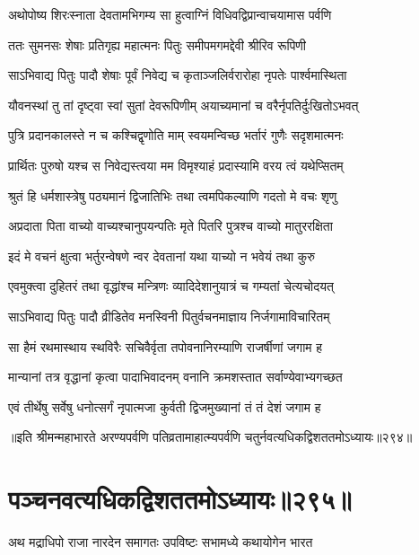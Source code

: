 \twolineshloka
{अथोपोष्य शिरःस्नाता देवतामभिगम्य सा}
{हुत्वाग्निं विधिवद्विप्रान्वाचयामास पर्वणि}


\twolineshloka
{ततः सुमनसः शेषाः प्रतिगृह्य महात्मनः}
{पितुः समीपमगमद्देवी श्रीरिव रूपिणी}


\twolineshloka
{साऽभिवाद्य पितुः पादौ शेषाः पूर्वं निवेद्य च}
{कृताञ्जलिर्वरारोहा नृपतेः पार्श्वमास्थिता}


\twolineshloka
{यौवनस्थां तु तां दृष्ट्वा स्वां सुतां देवरूपिणीम्}
{अयाच्यमानां च वरैर्नृपतिर्दुःखितोऽभवत्}




\twolineshloka
{पुत्रि प्रदानकालस्ते न च कश्चिद्वृणोति माम्}
{स्वयमन्विच्छ भर्तारं गुणैः सदृशमात्मनः}


\twolineshloka
{प्रार्थितः पुरुषो यश्च स निवेद्यस्त्वया मम}
{विमृश्याहं प्रदास्यामि वरय त्वं यथेप्सितम्}


\twolineshloka
{श्रुतं हि धर्मशास्त्रेषु पठ्यमानं द्विजातिभिः}
{तथा त्वमपिकल्याणि गदतो मे वचः शृणु}


\twolineshloka
{अप्रदाता पिता वाच्यो वाच्यश्चानुपयन्पतिः}
{मृते पितरि पुत्रश्च वाच्यो मातुररक्षिता}


\twolineshloka
{इदं मे वचनं क्षुत्वा भर्तुरन्वेषणे न्वर}
{देवतानां यथा याच्यो न भवेयं तथा कुरु}


\twolineshloka
{एवमुक्त्वा दुहितरं तथा वृद्धांश्च मन्त्रिणः}
{व्यादिदेशानुयात्रं च गम्यतां चेत्यचोदयत्}


\twolineshloka
{साऽभिवाद्य पितुः पादौ व्रीडितेव मनस्विनी}
{पितुर्वचनमाज्ञाय निर्जगामाविचारितम्}


\twolineshloka
{सा हैमं रथमास्थाय स्थविरैः सचिवैर्वृता}
{तपोवनानिरम्याणि राजर्षीणां जगाम ह}


\twolineshloka
{मान्यानां तत्र वृद्धानां कृत्वा पादाभिवादनम्}
{वनानि क्रमशस्तात सर्वाण्येवाभ्यगच्छत}


\twolineshloka
{एवं तीर्थेषु सर्वेषु धनोत्सर्गं नृपात्मजा}
{कुर्वती द्विजमुख्यानां तं तं देशं जगाम ह}


॥इति श्रीमन्महाभारते अरण्यपर्वणि पतिव्रतामाहात्म्यपर्वणि चतुर्नवत्यधिकद्विशततमोऽध्यायः॥२९४॥


\chapter{पञ्चनवत्यधिकद्विशततमोऽध्यायः॥२९५॥}


\twolineshloka
{अथ मद्राधिपो राजा नारदेन समागतः}
{उपविष्टः सभामध्ये कथायोगेन भारत}


